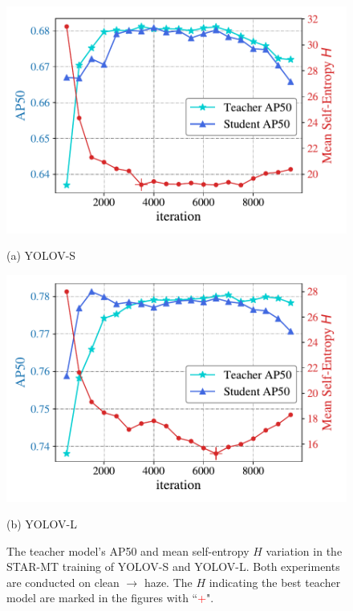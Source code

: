\begin{figure}[t]
\small
\begin{minipage}[b]{.49\linewidth}
  \centering
\includegraphics[width=\linewidth]{figures/yolovs.pdf}%
  \vspace{0.1cm}
  \centerline{(a) YOLOV-S}
\end{minipage}
\hfill
\begin{minipage}[b]{0.49\linewidth}
  \centering
\includegraphics[width=\linewidth]{figures/yolovl.pdf}%
  \vspace{0.1cm}
  \centerline{(b) YOLOV-L}
\end{minipage}
\caption{The teacher model's AP50 and mean self-entropy $H$ variation in the STAR-MT training of YOLOV-S and YOLOV-L. Both experiments are conducted on clean $\rightarrow$ haze. The $H$ indicating the best teacher model are marked in the figures with ``\textcolor{red}{+}".}
\label{fig:curve}
\end{figure}

